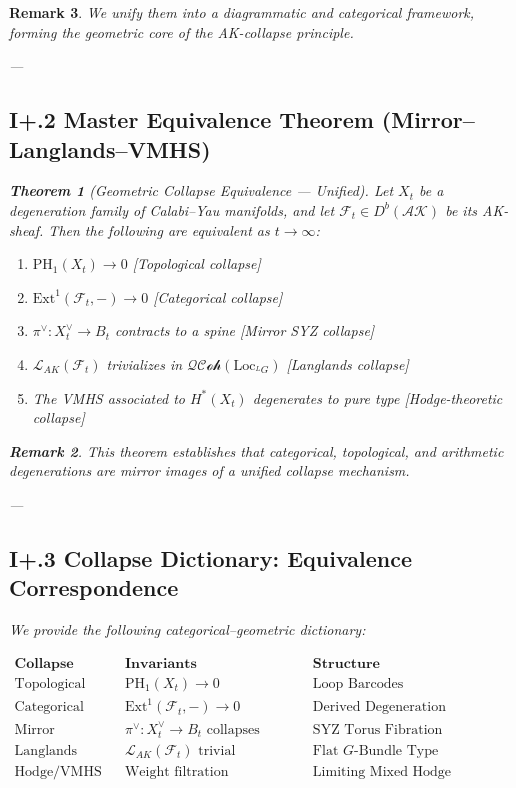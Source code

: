 \documentclass[11pt]{article}
\newtheorem{theorem}{Theorem}[section]
\newtheorem{remark}[theorem]{Remark}
\begin{document}
\begin{remark}
We unify them into a diagrammatic and categorical framework, forming the geometric core of the AK-collapse principle.

---

\subsection*{I+.2 Master Equivalence Theorem (Mirror–Langlands–VMHS)}

\begin{theorem}[Geometric Collapse Equivalence — Unified]
Let \( X_t \) be a degeneration family of Calabi–Yau manifolds, and let \( \mathcal{F}_t \in D^b(\mathcal{AK}) \) be its AK-sheaf. Then the following are equivalent as \( t \to \infty \):
\begin{enumerate}
  \item \( \mathrm{PH}_1(X_t) \to 0 \) \hfill [Topological collapse]
  \item \( \mathrm{Ext}^1(\mathcal{F}_t, -) \to 0 \) \hfill [Categorical collapse]
  \item \( \pi^\vee: X_t^\vee \to B_t \) contracts to a spine \hfill [Mirror SYZ collapse]
  \item \( \mathcal{L}_{AK}(\mathcal{F}_t) \) trivializes in \( \mathcal{QCoh}(\mathrm{Loc}_{^LG}) \) \hfill [Langlands collapse]
  \item The VMHS associated to \( H^*(X_t) \) degenerates to pure type \hfill [Hodge-theoretic collapse]
\end{enumerate}
\end{theorem}

\begin{remark}
This theorem establishes that categorical, topological, and arithmetic degenerations are mirror images of a unified collapse mechanism.
\end{remark}

---

\subsection*{I+.3 Collapse Dictionary: Equivalence Correspondence}

We provide the following categorical–geometric dictionary:

\[
\begin{array}{lll}
\textbf{Collapse Type} & \textbf{Invariants} & \textbf{Structure} \\
\hline
\text{Topological} & \mathrm{PH}_1(X_t) \to 0 & \text{Loop Barcodes} \\
\text{Categorical} & \mathrm{Ext}^1(\mathcal{F}_t, -) \to 0 & \text{Derived Degeneration} \\
\text{Mirror} & \pi^\vee: X_t^\vee \to B_t \text{ collapses} & \text{SYZ Torus Fibration} \\
\text{Langlands} & \mathcal{L}_{AK}(\mathcal{F}_t) \text{ trivial} & \text{Flat } G\text{-Bundle Type} \\
\text{Hodge/VMHS} & \text{Weight filtration degenerates} & \text{Limiting Mixed Hodge Structure} \\
\end{array}
\]


\end{remark}
\end{document}
